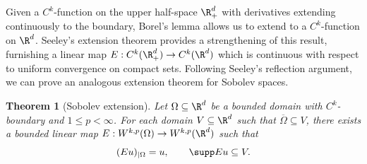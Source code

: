 \documentclass[reqno]{amsart}
\newtheorem{theorem}{Theorem}
\theoremstyle{definition}
\theoremstyle{remark}
\begin{document}
Given a $C^k$-function on the upper half-space $\R^d_+$ with derivatives extending continuously to the boundary, Borel's lemma allows us to extend to a $C^k$-function on $\R^d$. Seeley's extension theorem \cite{Seeley64} provides a strengthening of this result, furnishing a linear map $E: C^k (\R^d_+) \to C^k (\R^d)$ which is continuous with respect to uniform convergence on compact sets. Following Seeley's reflection argument, we can prove an analogous extension theorem for Sobolev spaces. 

\begin{theorem}[Sobolev extension]
	Let $\Omega \subseteq \R^d$ be a bounded domain with $C^k$-boundary and $1 \leq p < \infty$. For each domain $V \subseteq \R^d$ such that $\overline \Omega \subseteq V$, there exists a bounded linear map $E: W^{k, p} (\Omega) \to W^{k, p} (\R^d)$ such that 
		\[ (Eu)_{|\Omega} = u, \qquad \supp Eu \subseteq V. \]	
\end{theorem}
\end{document}
